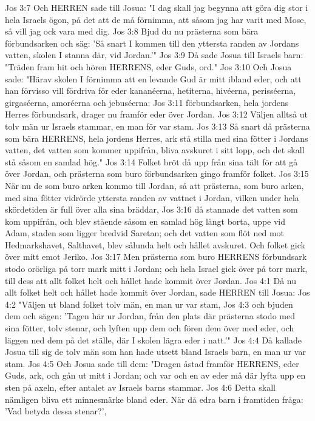 Jos 3:7  Och HERREN sade till Josua: "I dag skall jag begynna att göra dig stor i hela Israels ögon, på det att de må förnimma, att såsom jag har varit med Mose, så vill jag ock vara med dig.
Jos 3:8  Bjud du nu prästerna som bära förbundsarken och säg: 'Så snart I kommen till den yttersta randen av Jordans vatten, skolen I stanna där, vid Jordan.'"
Jos 3:9  Då sade Josua till Israels barn: "Träden fram hit och hören HERRENS, eder Guds, ord."
Jos 3:10  Och Josua sade: "Härav skolen I förnimma att en levande Gud är mitt ibland eder, och att han förvisso vill fördriva för eder kananéerna, hetiterna, hivéerna, perisséerna, girgaséerna, amoréerna och jebuséerna:
Jos 3:11  förbundsarken, hela jordens Herres förbundsark, drager nu framför eder över Jordan.
Jos 3:12  Väljen alltså ut tolv män ur Israels stammar, en man för var stam.
Jos 3:13  Så snart då prästerna som bära HERRENS, hela jordens Herres, ark stå stilla med sina fötter i Jordans vatten, det vatten som kommer uppifrån, bliva avskuret i sitt lopp, och det skall stå såsom en samlad hög."
Jos 3:14  Folket bröt då upp från sina tält för att gå över Jordan, och prästerna som buro förbundsarken gingo framför folket.
Jos 3:15  När nu de som buro arken kommo till Jordan, så att prästerna, som buro arken, med sina fötter vidrörde yttersta randen av vattnet i Jordan, vilken under hela skördetiden är full över alla sina bräddar,
Jos 3:16  då stannade det vatten som kom uppifrån, och blev stående såsom en samlad hög långt borta, uppe vid Adam, staden som ligger bredvid Saretan; och det vatten som flöt ned mot Hedmarkshavet, Salthavet, blev sålunda helt och hållet avskuret. Och folket gick över mitt emot Jeriko.
Jos 3:17  Men prästerna som buro HERRENS förbundsark stodo orörliga på torr mark mitt i Jordan; och hela Israel gick över på torr mark, till dess att allt folket helt och hållet hade kommit över Jordan.
Jos 4:1  Då nu allt folket helt och hållet hade kommit över Jordan, sade HERREN till Josua:
Jos 4:2  "Väljen ut bland folket tolv män, en man ur var stam,
Jos 4:3  och bjuden dem och sägen: 'Tagen här ur Jordan, från den plats där prästerna stodo med sina fötter, tolv stenar, och lyften upp dem och fören dem över med eder, och läggen ned dem på det ställe, där I skolen lägra eder i natt.'"
Jos 4:4  Då kallade Josua till sig de tolv män som han hade utsett bland Israels barn, en man ur var stam.
Jos 4:5  Och Josua sade till dem: "Dragen åstad framför HERRENS, eder Guds, ark, och gån ut mitt i Jordan; och var och en av eder må där lyfta upp en sten på axeln, efter antalet av Israels barns stammar.
Jos 4:6  Detta skall nämligen bliva ett minnesmärke bland eder. När då edra barn i framtiden fråga: 'Vad betyda dessa stenar?',

